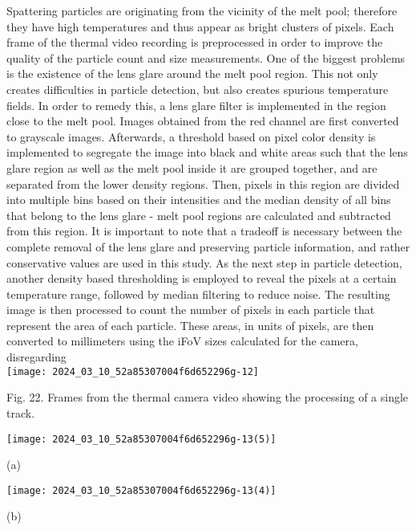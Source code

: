 \documentclass[10pt]{article}
\begin{document}
Spattering particles are originating from the vicinity of the melt pool; therefore they have high temperatures and thus appear as bright clusters of pixels. Each frame of the thermal video recording is preprocessed in order to improve the quality of the particle count and size measurements. One of the biggest problems is the existence of the lens glare around the melt pool region. This not only creates difficulties in particle detection, but also creates spurious temperature fields. In order to remedy this, a lens glare filter is implemented in the region close to the melt pool. Images obtained from the red channel are first converted to grayscale images. Afterwards, a threshold based on pixel color density is implemented to segregate the image into black and white areas such that the lens glare region as well as the melt pool inside it are grouped together, and are separated from the lower density regions. Then, pixels in this region are divided into multiple bins based on their intensities and the median density of all bins that belong to the lens glare - melt pool regions are calculated and subtracted from this region. It is important to note that a tradeoff is necessary between the complete removal of the lens glare and preserving particle information, and rather conservative values are used in this study. As the next step in particle detection, another density based thresholding is employed to reveal the pixels at a certain temperature range, followed by median filtering to reduce noise. The resulting image is then processed to count the number of pixels in each particle that represent the area of each particle. These areas, in units of pixels, are then converted to millimeters using the iFoV sizes calculated for the camera, disregarding\\
\texttt{[image: 2024\_03\_10\_52a85307004f6d652296g-12]}

Fig. 22. Frames from the thermal camera video showing the processing of a single track.

\begin{center}
\texttt{[image: 2024\_03\_10\_52a85307004f6d652296g-13(5)]}
\end{center}

(a)

\begin{center}
\texttt{[image: 2024\_03\_10\_52a85307004f6d652296g-13(4)]}
\end{center}

(b)
\end{document}
